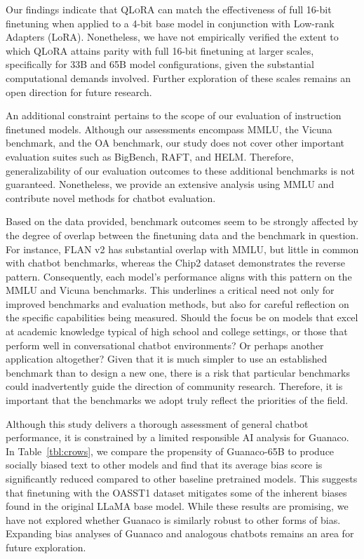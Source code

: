 Our findings indicate that \textsc{QLoRA} can match the effectiveness of full 16-bit finetuning when applied to a 4-bit base model in conjunction with Low-rank Adapters (LoRA). Nonetheless, we have not empirically verified the extent to which \textsc{QLoRA} attains parity with full 16-bit finetuning at larger scales, specifically for 33B and 65B model configurations, given the substantial computational demands involved. Further exploration of these scales remains an open direction for future research.

An additional constraint pertains to the scope of our evaluation of instruction finetuned models. Although our assessments encompass MMLU, the Vicuna benchmark, and the OA benchmark, our study does not cover other important evaluation suites such as BigBench, RAFT, and HELM. Therefore, generalizability of our evaluation outcomes to these additional benchmarks is not guaranteed. Nonetheless, we provide an extensive analysis using MMLU and contribute novel methods for chatbot evaluation.

Based on the data provided, benchmark outcomes seem to be strongly affected by the degree of overlap between the finetuning data and the benchmark in question. For instance, FLAN v2 has substantial overlap with MMLU, but little in common with chatbot benchmarks, whereas the Chip2 dataset demonstrates the reverse pattern. Consequently, each model’s performance aligns with this pattern on the MMLU and Vicuna benchmarks. This underlines a critical need not only for improved benchmarks and evaluation methods, but also for careful reflection on the specific capabilities being measured. Should the focus be on models that excel at academic knowledge typical of high school and college settings, or those that perform well in conversational chatbot environments? Or perhaps another application altogether? Given that it is much simpler to use an established benchmark than to design a new one, there is a risk that particular benchmarks could inadvertently guide the direction of community research. Therefore, it is important that the benchmarks we adopt truly reflect the priorities of the field.

Although this study delivers a thorough assessment of general chatbot performance, it is constrained by a limited responsible AI analysis for {Guanaco}. In Table~\ref{tbl:crows}, we compare the propensity of {Guanaco}-65B to produce socially biased text to other models and find that its average bias score is significantly reduced compared to other baseline pretrained models. This suggests that finetuning with the OASST1 dataset mitigates some of the inherent biases found in the original LLaMA base model. While these results are promising, we have not explored whether {Guanaco} is similarly robust to other forms of bias. Expanding bias analyses of {Guanaco} and analogous chatbots remains an area for future exploration.

